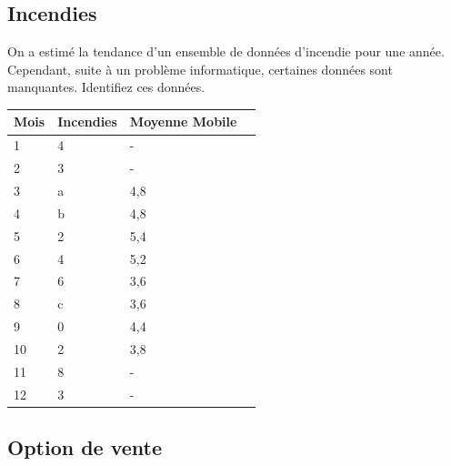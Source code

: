 \documentclass[11pt,english,francais]{article}
\begin{document}
\clearpage
\subsection{Incendies}

On a estimé la tendance d’un ensemble de données d’incendie pour une
année. Cependant, suite à un problème informatique, certaines données
sont manquantes. Identifiez ces données.\\

\begin{tabular}{|l|l|l|l|}
  \hline
  \multicolumn{1}{|l|}{Mois} & \multicolumn{1}{l|}{Incendies} & \multicolumn{1}{l|}{Moyenne Mobile} &  \\ \hline
  1 & 4 & \multicolumn{1}{l|}{-} &  \\ \hline
  2 & 3 & \multicolumn{1}{l|}{-} &  \\ \hline
  3 & \multicolumn{1}{l|}{a} & 4,8 &  \\ \hline
  4 & \multicolumn{1}{l|}{b} & 4,8 &  \\ \hline
  5 & 2 & 5,4 &  \\ \hline
  6 & 4 & 5,2 &  \\ \hline
  7 & 6 & 3,6 &  \\ \hline
  8 & \multicolumn{1}{l|}{c} & 3,6 &  \\ \hline
  9 & \multicolumn{1}{l|}{0} & 4,4 &  \\ \hline
  10 & 2 & 3,8 &  \\ \hline
  11 & 8 & \multicolumn{1}{l|}{-} &  \\ \hline
  12 & 3 & \multicolumn{1}{l|}{-} &  \\ \hline
\end{tabular}

\clearpage
\subsection{Option de vente}
\end{document}
